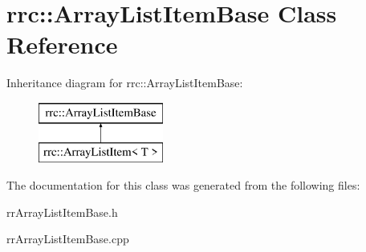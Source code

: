 \hypertarget{classrrc_1_1_array_list_item_base}{}\section{rrc\+:\+:Array\+List\+Item\+Base Class Reference}
\label{classrrc_1_1_array_list_item_base}
Inheritance diagram for rrc\+:\+:Array\+List\+Item\+Base\+:\begin{figure}[H]
\begin{center}
\leavevmode
\includegraphics[height=2.000000cm]{classrrc_1_1_array_list_item_base}
\end{center}
\end{figure}


The documentation for this class was generated from the following files\+:\begin{DoxyCompactItemize}
\item 
rr\+Array\+List\+Item\+Base.\+h\item 
rr\+Array\+List\+Item\+Base.\+cpp\end{DoxyCompactItemize}
